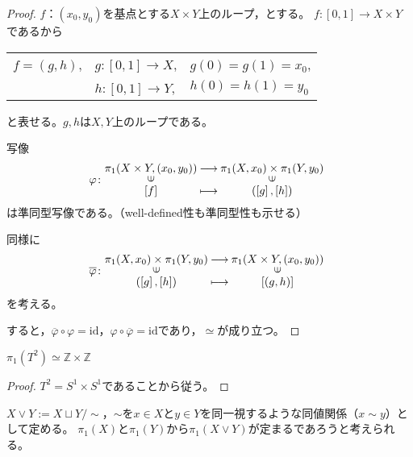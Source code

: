 \documentclass[uplatex]{jsarticle}
\begin{document}
\begin{proof}
  $f$：$(x_{0}, y_{0})$を基点とする$X \times Y$上のループ，とする。
  $f \colon [0,1] \longrightarrow X \times Y$であるから

  \renewcommand{\arraystretch}{1.0}
  \begin{tabular}{lll}
    $f = (g,h)$, & $g \colon [0,1] \longrightarrow X$, & $g(0) = g(1) = x_{0}$, \\
    & $h \colon [0,1] \longrightarrow Y$, & $h(0) = h(1) = y_{0}$
  \end{tabular}
  \renewcommand{\arraystretch}{1.3}

  と表せる。$g,h$は$X,Y$上のループである。
  
  写像
  \begin{equation}
    \varphi \colon \mapdef{\pi_{1}(X \times Y, (x_{0}, y_{0}))}{\pi_{1}(X, x_{0}) \times \pi_{1}(Y, y_{0})}{\left[ f \right]}{(\left[ g \right], \left[ h \right])}  
  \end{equation}
  は準同型写像である。（well-defined性も準同型性も示せる）

  同様に
  \begin{equation}
    \overline{\varphi} \colon \mapdef{\pi_{1}(X, x_{0}) \times \pi_{1}(Y, y_{0})}{\pi_{1}(X \times Y, (x_{0}, y_{0}))}{(\left[ g \right], \left[ h \right])}{\left[ (g,h) \right]}
  \end{equation}
  を考える。
  
  すると，$\overline{\varphi} \circ \varphi = \mathrm{id}$，$\varphi \circ \overline{\varphi} = \mathrm{id}$であり，$\simeq$が成り立つ。
\end{proof}

\sukima {}
\begin{corr}
  $\pi_{1}(T^{2}) \simeq \mathbb{Z} \times \mathbb{Z}$
\end{corr}

\begin{proof}
  $T^{2} = S^{1} \times S^{1}$であることから従う。
\end{proof}

\sukima {}

$X \vee Y := X \sqcup Y / \sim$，$\sim$を$x \in X$と$y \in Y$を同一視するような同値関係（$x \sim y$）として定める。
$\pi_{1}(X)$と$\pi_{1}(Y)$から$\pi_{1}(X \vee Y)$が定まるであろうと考えられる。
\end{document}
